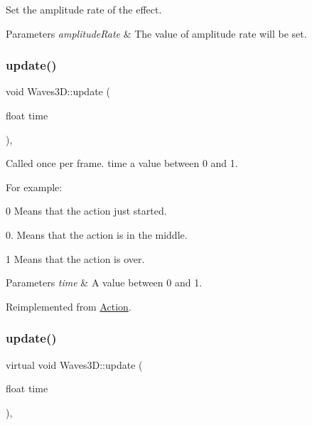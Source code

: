 Set the amplitude rate of the effect. 


\begin{DoxyParams}{Parameters}
{\em amplitude\+Rate} & The value of amplitude rate will be set. \\
\hline
\end{DoxyParams}
\mbox{\label{classWaves3D_ab57395f1108bb8a86bf722ebbab2cdd1}} 
\subsubsection{\texorpdfstring{update()}{update()}\hspace{0.1cm}{\footnotesize\ttfamily [1/2]}}
{\footnotesize\ttfamily void Waves3\+D\+::update (\begin{DoxyParamCaption}\item[{float}]{time }\end{DoxyParamCaption})\hspace{0.3cm}{\ttfamily [override]}, {\ttfamily [virtual]}}

Called once per frame. time a value between 0 and 1.

For example\+:
\begin{DoxyItemize}
\item 0 Means that the action just started.
\item 0. Means that the action is in the middle.
\item 1 Means that the action is over.
\end{DoxyItemize}


\begin{DoxyParams}{Parameters}
{\em time} & A value between 0 and 1. \\
\hline
\end{DoxyParams}


Reimplemented from \hyperlink{classAction_a937e646e63915e33ad05ba149bfcf239}{Action}.

\mbox{\label{classWaves3D_a89e5e21533760e4193b50354652b57fb}} 
\subsubsection{\texorpdfstring{update()}{update()}\hspace{0.1cm}{\footnotesize\ttfamily [2/2]}}
{\footnotesize\ttfamily virtual void Waves3\+D\+::update (\begin{DoxyParamCaption}\item[{float}]{time }\end{DoxyParamCaption})\hspace{0.3cm}{\ttfamily [override]}, {\ttfamily [virtual]}}

